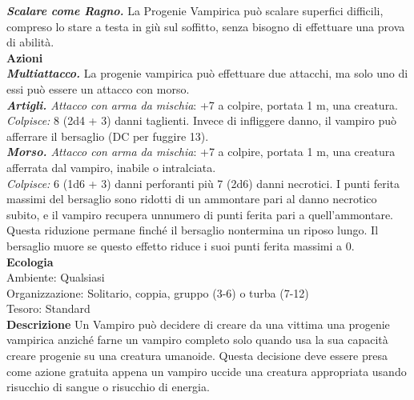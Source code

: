 \begin{multicols}{2}
\emph{\textbf{Scalare come Ragno.}} La Progenie Vampirica può scalare superfici difficili, compreso lo stare a testa in giù sul soffitto, senza bisogno di effettuare una prova di abilità.\\

\smallskip\textbf{Azioni} \\

\emph{\textbf{Multiattacco.}} La progenie vampirica può effettuare due attacchi, ma solo uno di essi può essere un attacco con morso.\\

\emph{\textbf{Artigli.} Attacco con arma da mischia}: +7 a colpire, portata 1 m, una creatura.\\

\emph{Colpisce:} 8 (2d4 + 3) danni taglienti. Invece di infliggere danno, il vampiro può afferrare il bersaglio (DC per fuggire 13).\\

\emph{\textbf{Morso.} Attacco con arma da mischia}: +7 a colpire, portata 1 m, una creatura afferrata dal vampiro, inabile o intralciata.\\

\emph{Colpisce:} 6 (1d6 + 3) danni perforanti più 7 (2d6) danni necrotici. I punti ferita massimi del bersaglio sono ridotti di un ammontare pari al danno necrotico subito, e il vampiro recupera unnumero di punti ferita pari a quell'ammontare. Questa riduzione permane  finché il bersaglio nontermina un riposo lungo. Il bersaglio muore se  questo effetto riduce i suoi punti ferita massimi a 0.\\
\textbf{Ecologia}\\
Ambiente: Qualsiasi\\
Organizzazione: Solitario, coppia, gruppo (3-6) o turba (7-12)\\
Tesoro: Standard\\
\textbf{Descrizione}
Un Vampiro può decidere di creare da una vittima una progenie vampirica anziché farne un vampiro completo solo quando usa la sua capacità creare progenie su una creatura umanoide. Questa decisione deve essere presa come azione gratuita appena un vampiro uccide una creatura appropriata usando risucchio di sangue o risucchio di energia. \\


\end{multicols}
